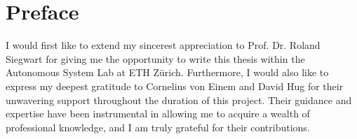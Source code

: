 \chapter*{Preface}

I would first like to extend my sincerest appreciation to Prof. Dr. Roland Siegwart for giving me the opportunity to write this thesis within the Autonomous System Lab at ETH Zürich. Furthermore, I would also like to express my deepest gratitude to Cornelius von Einem and David Hug for their unwavering support throughout the duration of this project. Their guidance and expertise have been instrumental in allowing me to acquire a wealth of professional knowledge, and I am truly grateful for their contributions. 
